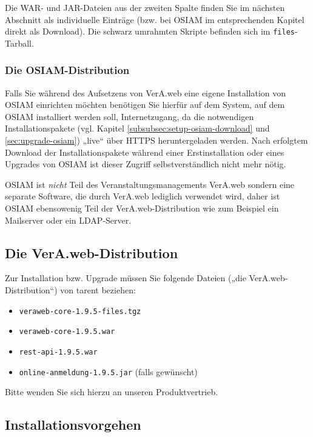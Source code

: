 \documentclass{tarentanleitung}
\newcommand{\vwiaverssw}{1.9.5}
\begin{document}
Die WAR‑ und JAR-Dateien aus der zweiten Spalte finden Sie im
nächsten Abschnitt als individuelle Einträge (bzw. bei OSIAM
im entsprechenden Kapitel direkt als Download). Die schwarz
umrahmten Skripte befinden sich im \texttt{files}-Tarball.

\subsubsection{Die OSIAM-Distribution}\label{subsubsec:intro-distro-ong}

Falls Sie während des Aufsetzens von VerA.web eine eigene Installation
von OSIAM einrichten möchten benötigen Sie hierfür auf dem System, auf
dem OSIAM installiert werden soll, Internetzugang, da die notwendigen
Installationspakete (vgl. Kapitel \ref{subsubsec:setup-osiam-download} und
\ref{sec:upgrade-osiam}) „live“ über HTTPS heruntergeladen werden. Nach
erfolgtem Download der Installationspakete während einer Erstinstallation
oder eines Upgrades von OSIAM ist dieser Zugriff selbstverständlich nicht
mehr nötig.

OSIAM ist \emph{nicht} Teil des Veranstaltungsmanagements VerA.web sondern
eine separate Software, die durch VerA.web lediglich verwendet wird, daher
ist OSIAM ebensowenig Teil der VerA.web-Distribution wie zum Beispiel ein
Mailserver oder ein LDAP-Server.

\subsection{Die VerA.web-Distribution}\label{subsec:intro-distro}

Zur Installation bzw. Upgrade müssen Sie folgende Dateien („die
VerA.web-Distribution“) von tarent beziehen:\keinumbruch

\begin{itemize}
 \item{\texttt{veraweb-core-\vwiaverssw{}-files.tgz}}
 \item{\texttt{veraweb-core-\vwiaverssw{}.war}}
 \item{\texttt{rest-api-\vwiaverssw{}.war}}
 \item{\texttt{online-anmeldung-\vwiaverssw{}.jar} (falls gewünscht)}
\end{itemize}

Bitte wenden Sie sich hierzu an unseren Produktvertrieb.

\subsection{Installationsvorgehen}\label{subsec:intro-install}
\end{document}
